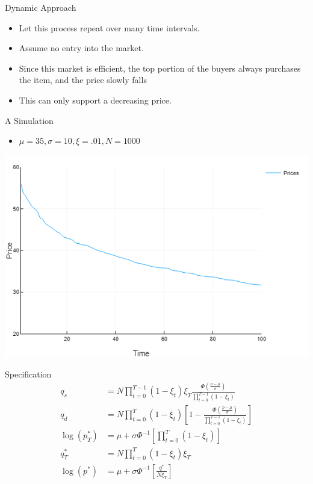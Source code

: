 \documentclass[bigger]{beamer}
\begin{document}
\begin{frame}[label=sec-1-11]{Dynamic Approach}
\begin{itemize}
\item Let this process repeat over many time intervals.
\item Assume no entry into the market.
\item Since this market is efficient, the top portion of the buyers always
purchases the item, and the price slowly falls
\item This can only support a decreasing price.
\end{itemize}
\end{frame}

\begin{frame}[label=sec-1-12]{A Simulation}
\begin{itemize}
\item $\mu = 35, \sigma = 10, \xi = .01, N = 1000$
\end{itemize}
\includegraphics[width=.9\linewidth]{../Scripts/PriceOverTime.png}
\end{frame}

\begin{frame}[label=sec-1-13]{Specification}
\begin{align*}
q_s &= N \prod_{t=0}^{T-1} (1-\xi_t ) \xi_T \frac{\Phi \left ( \frac{ p - \mu }{\sigma} \right )}{ \prod_{t=0}^{T-1} ( 1 - \xi_t ) }\\
q_d &= N \prod_{t=0}^{T} ( 1- \xi_t ) \left [ 1 - \frac{ \Phi \left ( \frac{
p - \mu }{ \sigma } \right ) }{ \prod_{t=0}^{T-1} (1 - \xi_t ) } \right ]\\
\log ( p_T^* ) &= \mu + \sigma \Phi^{-1} \left [ \prod_{t=0}^T ( 1 - \xi_t ) \right ]\\
q_T^* &= N \prod_{t=0}^T ( 1 - \xi_t ) \xi_T \\
\log ( p^* ) &= \mu + \sigma \Phi^{-1} \left [ \frac{ q^* }{ N \xi_T} \right ]\\
\end{align*}
\end{frame}
\end{document}
